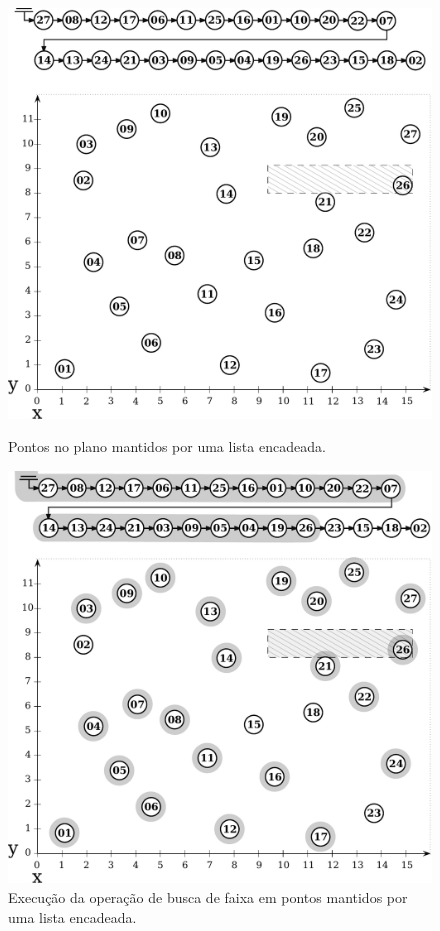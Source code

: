 \begin{figure}[ht]
  \centering
  \begin{minipage}[t]{0.48\textwidth}
    \includegraphics[width=\textwidth]{img/points-query/lst/points-lst-model}
    \caption{Pontos no plano mantidos por uma lista encadeada.}
    \label{img:pts-lst-model}
  \end{minipage}
  \hfill
  \begin{minipage}[t]{0.48\textwidth}
    \includegraphics[width=\textwidth]{img/points-query/lst/points-lst-query}
    \caption{Execução da operação de busca de faixa em pontos mantidos por uma lista encadeada.}
    \label{img:pts-lst-query}
  \end{minipage}
\end{figure}



